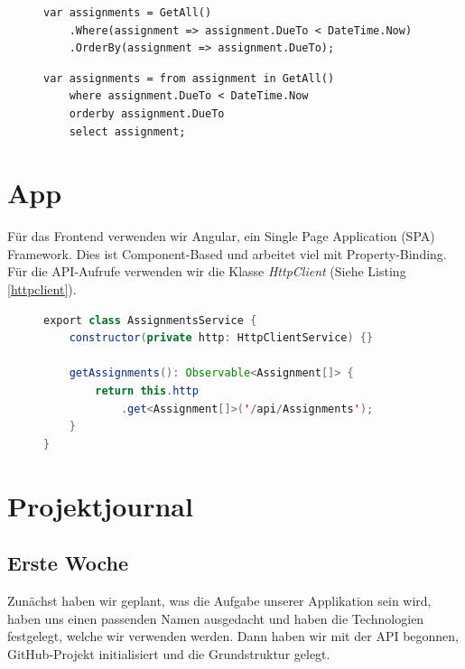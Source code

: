 \documentclass[a4paper, titlepage]{article}
\begin{document}
    \begin{figure}
    \begin{lstlisting}[caption=Lambda-Syntax, label=lambda]
var assignments = GetAll()
    .Where(assignment => assignment.DueTo < DateTime.Now)
    .OrderBy(assignment => assignment.DueTo);
    \end{lstlisting}

    \begin{lstlisting}[caption=Query-Syntax, label=query]
var assignments = from assignment in GetAll()
    where assignment.DueTo < DateTime.Now
    orderby assignment.DueTo
    select assignment;
    \end{lstlisting}
\end{figure}


    \section{App}
    Für das Frontend verwenden wir Angular, ein Single Page Application (SPA) Framework. Dies ist Component-Based
    und arbeitet viel mit Property-Binding. Für die API-Aufrufe verwenden wir die Klasse \emph{HttpClient} (Siehe 
    Listing \ref{httpclient}).

    \begin{figure}
        
    \begin{lstlisting}[language=java,caption=HttpClient, label=httpclient]
export class AssignmentsService {
    constructor(private http: HttpClientService) {}
    
    getAssignments(): Observable<Assignment[]> {
        return this.http
            .get<Assignment[]>('/api/Assignments');
    }
} 

    \end{lstlisting}
    \end{figure}

    \section{Projektjournal}
    \subsection{Erste Woche}
    Zunächst haben wir geplant, was die Aufgabe unserer Applikation sein wird, haben uns einen passenden Namen ausgedacht und
    haben die Technologien festgelegt, welche wir verwenden werden. Dann haben wir mit der API begonnen, GitHub-Projekt initialisiert
    und die Grundstruktur gelegt.
\end{document}

